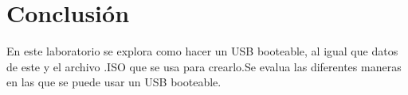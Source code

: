 \documentclass[stu, 12pt, letterpaper, donotrepeattitle, floatsintext, natbib, helv]{apa7}
\begin{document}
\section*{Conclusión}
{}

En este laboratorio se explora como hacer un USB booteable, al igual que datos de este y el archivo .ISO que se usa para crearlo.Se evalua las diferentes maneras en las que se puede usar un USB booteable.

\newpage
\renewcommand\refname{\large\textbf{Referencias}}

\end{document}
